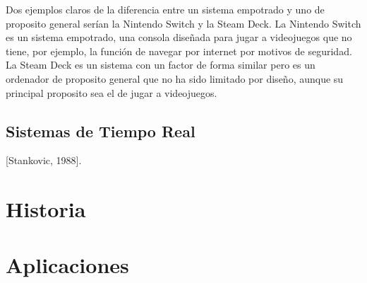 Dos ejemplos claros de la diferencia entre un sistema empotrado y uno de proposito general serían la Nintendo Switch y la Steam Deck. La Nintendo Switch es un sistema empotrado, una consola diseñada para jugar a videojuegos que no tiene, por ejemplo, la función de navegar por internet por motivos de seguridad. La Steam Deck es un sistema con un factor de forma similar pero es un ordenador de proposito general que no ha sido limitado por diseño, aunque su principal proposito sea el de jugar a videojuegos.

\begin{center}\colorbox{yellow!10}{} \end{center}

\subsection{Sistemas de Tiempo Real}

 [Stankovic, 1988].

\section{Historia}

\section{Aplicaciones}
